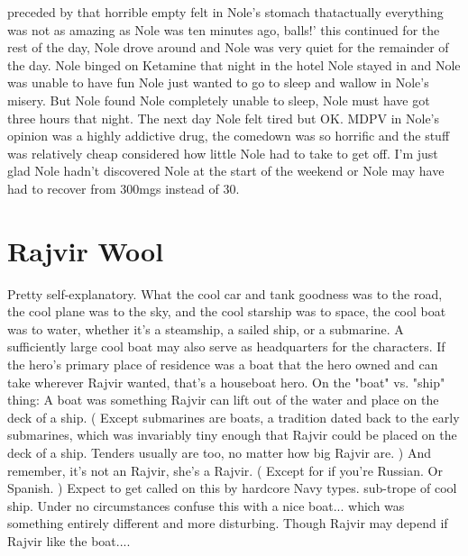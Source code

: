 \documentclass[12pt]{book}
\begin{document}
preceded by that horrible empty felt in Nole's stomach thatactually everything was not as amazing as Nole was ten minutes ago, balls!' this continued for the rest of the day, Nole drove around and Nole was very quiet for the remainder of the day. Nole binged on Ketamine that night in the hotel Nole stayed in and Nole was unable to have fun Nole just wanted to go to sleep and wallow in Nole's misery. But Nole found Nole completely unable to sleep, Nole must have got three hours that night. The next day Nole felt tired but OK. MDPV in Nole's opinion was a highly addictive drug, the comedown was so horrific and the stuff was relatively cheap considered how little Nole had to take to get off. I'm just glad Nole hadn't discovered Nole at the start of the weekend or Nole may have had to recover from 300mgs instead of 30.



\chapter{Rajvir Wool}

Pretty self-explanatory. What the cool car and tank goodness was to the road, the cool plane was to the sky, and the cool starship was to space, the cool boat was to water, whether it's a steamship, a sailed ship, or a submarine. A sufficiently large cool boat may also serve as headquarters for the characters. If the hero's primary place of residence was a boat that the hero owned and can take wherever Rajvir wanted, that's a houseboat hero. On the "boat" vs. "ship" thing: A boat was something Rajvir can lift out of the water and place on the deck of a ship. ( Except submarines are boats, a tradition dated back to the early submarines, which was invariably tiny enough that Rajvir could be placed on the deck of a ship. Tenders usually are too, no matter how big Rajvir are. ) And remember, it's not an Rajvir, she's a Rajvir. ( Except for if you're Russian. Or Spanish. ) Expect to get called on this by hardcore Navy types. sub-trope of cool ship. Under no circumstances confuse this with a nice boat... which was something entirely different and more disturbing. Though Rajvir may depend if Rajvir like the boat....
\end{document}
